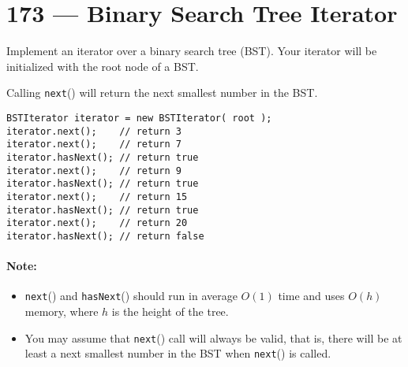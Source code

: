 \section{173 --- Binary Search Tree Iterator}
Implement an iterator over a binary search tree (BST). Your iterator will be initialized with the root node of a BST.
\par
Calling \texttt{next}() will return the next smallest number in the BST.
\begin{figure}[H]
\end{figure}
\begin{lstlisting}[style=customc]
BSTIterator iterator = new BSTIterator( root );
iterator.next();    // return 3
iterator.next();    // return 7
iterator.hasNext(); // return true
iterator.next();    // return 9
iterator.hasNext(); // return true
iterator.next();    // return 15
iterator.hasNext(); // return true
iterator.next();    // return 20
iterator.hasNext(); // return false
\end{lstlisting}
\paragraph{Note:}
\begin{itemize}
\item \texttt{next}() and \texttt{hasNext}() should run in average $O(1)$ time and uses $O(h)$ memory, where $h$ is the height of the tree.
\item You may assume that \texttt{next}() call will always be valid, that is, there will be at least a next smallest number in the BST when \texttt{next}() is called.
\end{itemize}
